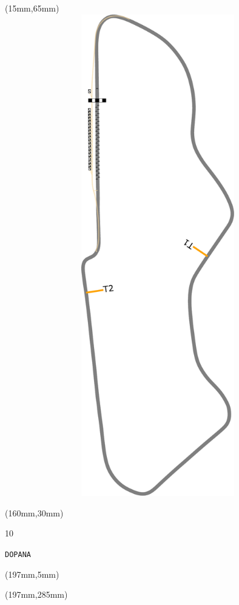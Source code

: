 \begin{textblock*}{185mm}(15mm,65mm)%
\centering
\mbox{\includegraphics[width=185mm,height=210mm,keepaspectratio]{PT/DOPANA.pdf}}
\end{textblock*}
\begin{textblock*}{40mm}(160mm,30mm)%
\Large
\par{} 
\par10 
\par\hfill\tiny\tt DOPANA\\
\end{textblock*}
\begin{textblock*}{20mm}(197mm,5mm)%
\fbox{\thepage}
\label{DOPANA}
\end{textblock*}
\begin{textblock*}{20mm}(197mm,285mm)%
\fbox{\thepage}
\end{textblock*}

